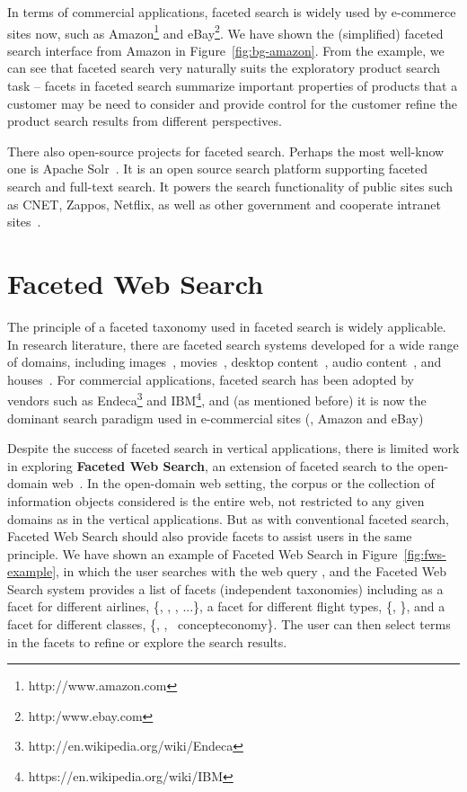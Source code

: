 In terms of commercial applications, faceted search is widely used by e-commerce sites now, such as Amazon\footnote{http://www.amazon.com} and eBay\footnote{http:/www.ebay.com}. We have shown the (simplified) faceted search interface from Amazon in Figure~\ref{fig:bg-amazon}. From the example, we can see that faceted search very naturally suits the exploratory product search task -- facets in faceted search summarize important properties of products that a customer may be need to consider and provide control for the customer refine the product search results from different perspectives. 

There also open-source projects for faceted search. Perhaps the most well-know one is  Apache Solr~\cite{smiley2011apache}. It is an open source search platform supporting faceted search and full-text search. It powers the search functionality of public sites such as CNET, Zappos, Netflix, as well as other government and cooperate intranet sites~\cite{wei2013survey}.

\section{Faceted Web Search}
\label{sec:bg-fws}
The principle of a faceted taxonomy used in faceted search is widely applicable. In research literature, there are faceted search systems developed for a wide range of domains, including images~\cite{yee2003faceted}, movies~\cite{koren2008personalized}, desktop content~\cite{cutrell2006fast}, audio content~\cite{diao2010faceted}, and houses~\cite{shneiderman1994dynamic}. For commercial applications, faceted search has been adopted by vendors such as Endeca\footnote{http://en.wikipedia.org/wiki/Endeca} and IBM\footnote{https://en.wikipedia.org/wiki/IBM}, and (as mentioned before) it is now the dominant search paradigm used in e-commercial sites (\eg, Amazon and eBay)

Despite the success of faceted search in vertical applications, there is limited work in exploring \textbf{Faceted Web Search}, an extension of faceted search to the open-domain web~\cite{kong2014extending}. In the open-domain web setting, the corpus or the collection of information objects considered is the entire web, not restricted to any given domains as in the vertical applications. But as with conventional faceted search, Faceted Web Search should also provide facets to assist users in the same principle. We have shown an example of Faceted Web Search in Figure~\ref{fig:fws-example}, in which the user searches with the web query , and the Faceted Web Search system provides a list of facets (independent taxonomies) including  as a facet for different airlines, \{, , , ...\}, a facet for different flight types, \{, \}, and a facet for different classes, \{, , \
concept{economy}\}. The user 
can then select terms in the facets to refine or explore the search results.

